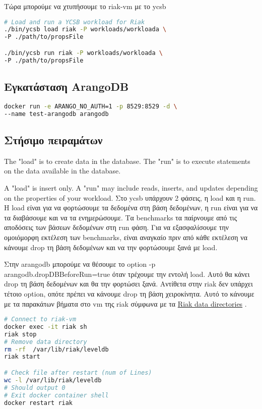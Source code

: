 \documentclass[conference]{IEEEtran}
\begin{document}
Τώρα μπορούμε να χτυπήσουμε το riak-vm με το ycsb
\begin{lstlisting}[language=bash
    ,    basicstyle=\small %or \tiny or \footnotesize etc.
]
# Load and run a YCSB workload for Riak
./bin/ycsb load riak -P workloads/workloada \
-P ./path/to/propsFile

./bin/ycsb run riak -P workloads/workloada \
-P ./path/to/propsFile

\end{lstlisting}





\subsection{Εγκατάσταση ArangoDB}

\begin{lstlisting}[language=bash
    ,    basicstyle=\small %or \tiny or \footnotesize etc.
]
docker run -e ARANGO_NO_AUTH=1 -p 8529:8529 -d \
--name test-arangodb arangodb
\end{lstlisting}

\subsection{Στήσιμο πειραμάτων}
The "load" is to create data in the database. The "run" is to execute statements on the data available in the database.

A "load" is insert only. A "run" may include reads, inserts, and updates depending on the properties of your workload.
Στο ycsb υπάρχουν 2 φάσεις, η load και η run. Η load είναι για να φορτώσουμε τα 
δεδομένα στη βάση δεδομένων, η run είναι για να τα διαβάσουμε και να τα 
ενημερώσουμε. Τα benchmarks τα παίρνουμε από τις αποδόσεις των βάσεων δεδομένων
στη run φάση.
Για να εξασφαλίσουμε την ομοιόμορφη εκτέλεση των benchmarks, είναι αναγκαίο πριν 
από κάθε εκτέλεση να κάνουμε drop τη βάση δεδομένων και να την φορτώσουμε ξανά με load.

Στην arangodb μπορούμε να θέσουμε το option -p arangodb.dropDBBeforeRun=true όταν τρέχουμε 
την εντολή load. Αυτό θα κάνει drop τη βάση δεδομένων και θα την φορτώσει ξανά.
Αντίθετα στην riak δεν υπάρχει τέτοιο option, οπότε πρέπει να κάνουμε drop τη βάση
χειροκίνητα. Αυτό το κάνουμε με τα παρακάτων βήματα στο vm της riak σύμφωνα με τα 
\href{https://docs.riak.com/riak/kv/2.1.4/using/cluster-operations/backing-up/#os-specific-directory-locations}{Riak data directories}
.
\begin{lstlisting}[language=bash
    ,    basicstyle=\small %or \tiny or \footnotesize etc.
]
# Connect to riak-vm
docker exec -it riak sh
riak stop
# Remove data directory
rm -rf 	/var/lib/riak/leveldb
riak start

# Check file after restart (num of Lines)
wc -l /var/lib/riak/leveldb
# Should output 0
# Exit docker container shell
docker restart riak
\end{lstlisting}
\end{document}
